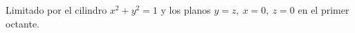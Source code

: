 \item Limitado por el cilindro $x^2 + y^2 = 1$ y los planos $y = z, \ x = 0, \ z = 0$ en el primer octante.
